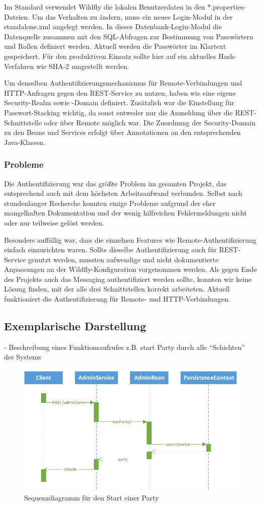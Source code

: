 Im Standard verwendet Wildfly die lokalen Benutzerdaten in den *.properties-Dateien. Um das Verhalten zu ändern, muss ein neues Login-Modul in der standalone.xml angelegt werden. In dieses Datenbank-Login-Modul die Datenquelle zusammen mit den SQL-Abfragen zur Bestimmung von Passwörtern und Rollen definiert werden. Aktuell werden die Passwörter im Klartext gespeichert. Für den produktiven Einsatz sollte hier auf ein aktuelles Hash-Verfahren wie SHA-2 umgestellt werden.

Um denselben Authentifizierungsmechanismus für Remote-Verbindungen und HTTP-Anfragen gegen den REST-Service zu nutzen, haben wie eine eigene Security-Realm sowie -Domain definiert. Zusätzlich war die Einstellung für Passwort-Stacking wichtig, da sonst entweder nur die Anmeldung über die REST-Schnittstelle oder über Remote möglich war. Die Zuordnung der Security-Domain zu den Beans und Services erfolgt über Annotationen an den entsprechenden Java-Klassen. 

\subsubsection{Probleme}
Die Authentifizierung war das größte Problem im gesamten Projekt, das entsprechend auch mit dem höchsten Arbeitsaufwand verbunden. Selbst nach stundenlanger Recherche konnten einige Probleme aufgrund der eher mangelhaften Dokumentation und der wenig hilfreichen Fehlermeldungen nicht oder nur teilweise gelöst werden.

Besonders auffällig war, dass die einzelnen Features wie Remote-Authentifizierung einfach einzurichten waren. Sollte dieselbe Authentifizierung auch für REST-Service genutzt werden, mussten aufwendige und nicht dokumentierte Anpassungen an der Wildfly-Konfiguration vorgenommen werden. Als gegen Ende des Projekts auch das Messaging authentifiziert werden sollte, konnten wir keine Lösung finden, mit der alle drei Schnittstellen korrekt arbeiteten. Aktuell funktioniert die Authentifizierung für Remote- und HTTP-Verbindungen. 


\subsection{Exemplarische Darstellung}
- Beschreibung eines Funktionsaufrufes z.B. start Party durch alle "`Schichten"' des Systems

\begin{figure}[tbh]
\centering
\includegraphics[width=1.0\linewidth]{Bilder/AufrufSequenz}
\caption{Sequenzdiagramm für den Start einer Party}
\label{fig:AufrufSequenz}
\end{figure}





